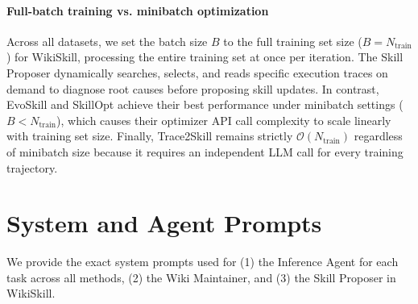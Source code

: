 \documentclass[11pt, a4paper, copyright, gr]{google}
\begin{document}
\paragraph{Full-batch training vs. minibatch optimization} Across all datasets, we set the batch size $B$ to the full training set size ($B = N_{\text{train}}$) for WikiSkill, processing the entire training set at once per iteration. The Skill Proposer dynamically searches, selects, and reads specific execution traces on demand to diagnose root causes before proposing skill updates. In contrast, EvoSkill and SkillOpt achieve their best performance under minibatch settings ($B < N_{\text{train}}$), which causes their optimizer API call complexity to scale linearly with training set size. Finally, Trace2Skill remains strictly $\mathcal{O}(N_{\text{train}})$ regardless of minibatch size because it requires an independent LLM call for every training trajectory.



\section{System and Agent Prompts}
\label{appendix:prompts}
We provide the exact system prompts used for (1) the Inference Agent for each task across all methods, (2) the Wiki Maintainer, and (3) the Skill Proposer in WikiSkill.
\end{document}
